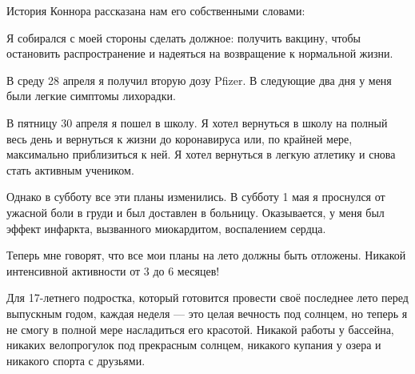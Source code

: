 История Коннора рассказана нам его собственными словами:

Я собирался с моей стороны сделать должное: получить вакцину, чтобы остановить
распространение и надеяться на возвращение к нормальной жизни.

В среду 28 апреля я получил вторую дозу Pfizer. В следующие два дня у меня были
легкие симптомы лихорадки.

В пятницу 30 апреля я пошел в школу. Я хотел вернуться в школу на полный весь
день и вернуться к жизни до коронавируса или, по крайней мере, максимально
приблизиться к ней. Я хотел вернуться в легкую атлетику и снова стать активным
учеником.

Однако в субботу все эти планы изменились. В субботу 1 мая я проснулся от
ужасной боли в груди и был доставлен в больницу. Оказывается, у меня был эффект
инфаркта, вызванного миокардитом, воспалением сердца.

Теперь мне говорят, что все мои планы на лето должны быть отложены. Никакой
интенсивной активности от 3 до 6 месяцев!

Для 17-летнего подростка, который готовится провести своё последнее лето перед
выпускным годом, каждая неделя — это целая вечность под солнцем, но теперь я не
смогу в полной мере насладиться его красотой. Никакой работы у бассейна, никаких
велопрогулок под прекрасным солнцем, никакого купания у озера и никакого спорта
с друзьями.
